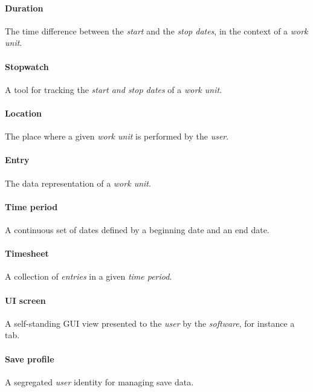 \paragraph{Duration} The time difference between the \emph{start} and the
  \emph{stop dates}, in the context of a \emph{work unit}.
\paragraph{Stopwatch} A tool for tracking the \emph{start and stop dates} of
  a \emph{work unit}.
\paragraph{Location} The place where a given \emph{work unit} is performed
  by the \emph{user}.
\paragraph{Entry} The data representation of a \emph{work unit}.
\paragraph{Time period} A continuous set of dates defined by a beginning
  date and an end date.
\paragraph{Timesheet} A collection of \emph{entries} in a given \emph{time
  period}.
\paragraph{\gls{UI} screen} A self-standing \gls{GUI} view presented to the
\emph{user} by the \emph{software}, for instance a tab.
\paragraph{Save profile} A segregated \emph{user} identity for managing save data.